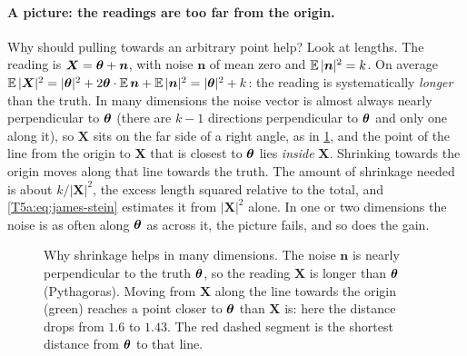 \paragraph{A picture: the readings are too far from the origin.}
Why should pulling towards an arbitrary point help? Look at lengths. The
reading is $\bm X=\bm{\theta}+\bm n$, with noise $\bm n$ of mean zero and
$\E|\bm n|^2=k$. On average
$\E|\bm X|^2=|\params|^2+2\params\cdot\E\bm n+\E|\bm n|^2=|\params|^2+k$:
the reading is systematically \emph{longer} than the truth. In many
dimensions the noise vector is almost always nearly perpendicular to
$\bm{\theta}$ (there are $k-1$ directions perpendicular to $\bm{\theta}$ and only
one along it), so $\bm X$ sits on the far side of a right angle, as in
\cref{T5a:fig:js-geometry}, and the point of the line from the origin to
$\bm X$ that is closest to $\bm{\theta}$ lies \emph{inside} $\bm X$. Shrinking
towards the origin moves along that line towards the truth. The amount of
shrinkage needed is about $k/|\bm X|^2$, the excess length squared relative
to the total, and \eqref{T5a:eq:james-stein} estimates it from $|\bm X|^2$
alone. In one or two dimensions the noise is as often along $\bm{\theta}$ as
across it, the picture fails, and so does the gain.

\begin{figure}[htbp]
\centering
{}
\caption{Why shrinkage helps in many dimensions. The noise $\bm n$ is
nearly perpendicular to the truth $\bm{\theta}$, so the reading $\bm X$ is longer
than $\bm{\theta}$ (Pythagoras). Moving from $\bm X$ along the line towards the
origin (green) reaches a point closer to $\bm{\theta}$ than $\bm X$ is: here the
distance drops from $1.6$ to $1.43$. The red dashed segment is the shortest
distance from $\bm{\theta}$ to that line.}
\label{T5a:fig:js-geometry}
\end{figure}

